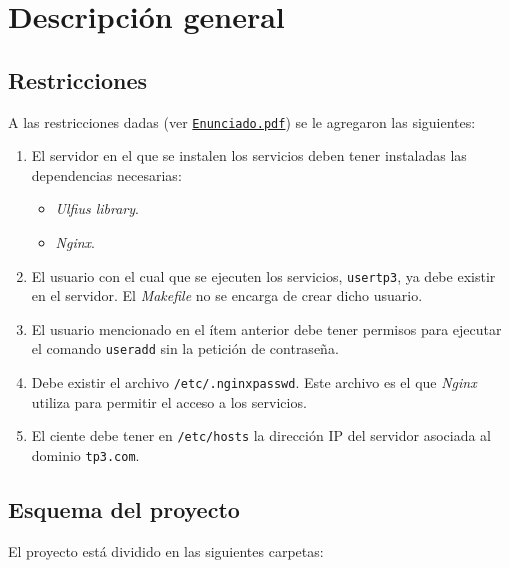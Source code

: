 \documentclass[12pt,a4paper]{article}
\begin{document}
\section{Descripción general}
\label{desc}

\subsection{Restricciones}
\label{restrictions}
A las restricciones dadas (ver \href{run:../Enunciado.pdf}
{\texttt{Enunciado.pdf}}) se le agregaron las siguientes:

\begin{enumerate}[leftmargin=1.5cm]
  \item El servidor en el que se instalen los servicios deben tener
  instaladas las dependencias necesarias:

  \begin{itemize}[leftmargin=1.5cm]
    \item \emph{Ulfius library}\cite{ulfius}.
    \item \emph{Nginx}\cite{nginx}.
  \end{itemize}

  \item El usuario con el cual que se ejecuten los servicios, \verb|usertp3|, ya
  debe existir en el servidor. El \emph{Makefile} no se encarga de
  crear dicho usuario.
  \item El usuario mencionado en el ítem anterior debe tener permisos para
  ejecutar el comando \verb|useradd| sin la petición de contraseña.
  \item Debe existir el archivo \verb|/etc/.nginxpasswd|. Este archivo es el que
  \emph{Nginx} utiliza para permitir el acceso a los servicios.
  \item El ciente debe tener en \verb|/etc/hosts| la dirección IP del servidor
  asociada al dominio \verb|tp3.com|.
\end{enumerate}


\subsection{Esquema del proyecto}
\label{esq}

El proyecto está dividido en las siguientes carpetas:
\end{document}
